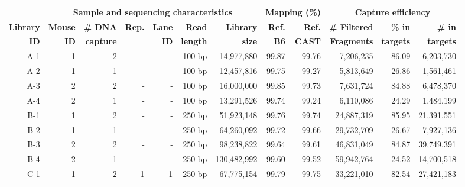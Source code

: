 \begin{sidewaystable}[p]
    \centering
	\begin{adjustbox}{width = 1\textwidth}
    \begin{tabular}{rrrrrrrrrrrr}
        \toprule
        \textbf{} & \multicolumn{6}{c}{\textbf{Sample and sequencing characteristics}} & \multicolumn{2}{c}{\textbf{Mapping (\%)}} & \multicolumn{3}{c}{\textbf{Capture efficiency}} \\
		\cmidrule(l){2-7} \cmidrule(l){8-9} \cmidrule(l){10-12}
        \textbf{Library} & \textbf{Mouse} & \textbf{\# DNA} & \textbf{Rep.} & \textbf{Lane} & \textbf{Read} & \textbf{Library} & \textbf{Ref.} & \textbf{Ref.} & \textbf{\# Filtered} & \textbf{\% in} & \textbf{\# in} \\
        \textbf{ID} & \textbf{ID} & \textbf{capture} & \textbf{} & \textbf{ID} & \textbf{length} & \textbf{size} & \textbf{B6} & \textbf{CAST} & \textbf{Fragments} & \textbf{targets} & \textbf{targets} \\
		\cmidrule(l){1-1} \cmidrule(l){2-7} \cmidrule(l){8-9} \cmidrule(l){10-12}
		A-1 & 1 & 2 & \textit{-} & \textit{-} & 100 bp & 14,977,880 & 99.87 & 99.76 & 7,206,235 & 86.09 & 6,203,730 \\
        A-2 & 1 & 1 & \textit{-} & \textit{-} & 100 bp & 12,457,816 & 99.75 & 99.27 & 5,813,649 & 26.86 & 1,561,461 \\
        A-3 & 2 & 2 & \textit{-} & \textit{-} & 100 bp & 16,000,000 & 99.85 & 99.73 & 7,631,724 & 84.88 & 6,478,370 \\
        A-4 & 2 & 1 & \textit{-} & \textit{-} & 100 bp & 13,291,526 & 99.74 & 99.24 & 6,110,086 & 24.29 & 1,484,199 \\
		\cmidrule(l){1-1} \cmidrule(l){2-7} \cmidrule(l){8-9} \cmidrule(l){10-12}
		B-1 & 1 & 2 & \textit{-} & \textit{-} & 250 bp & 51,923,148 & 99.76 & 99.74 & 24,887,319 & 85.95 & 21,391,551 \\
        B-2 & 1 & 1 & \textit{-} & \textit{-} & 250 bp & 64,260,092 & 99.72 & 99.66 & 29,732,709 & 26.67 & 7,927,136 \\
        B-3 & 2 & 2 & \textit{-} & \textit{-} & 250 bp & 98,238,822 & 99.64 & 99.61 & 46,831,049 & 84.87 & 39,749,391 \\
        B-4 & 2 & 1 & \textit{-} & \textit{-} & 250 bp & 130,482,992 & 99.60 & 99.52 & 59,942,764 & 24.52 & 14,700,518 \\
		\cmidrule(l){1-1} \cmidrule(l){2-7} \cmidrule(l){8-9} \cmidrule(l){10-12}
        C-1 & 1 & 2 & 1 & 1 & 250 bp & 67,775,154 & 99.79 & 99.75 & 33,221,010 & 82.54 & 27,421,183 \\

\end{tabular}
\end{adjustbox}
\end{sidewaystable}
